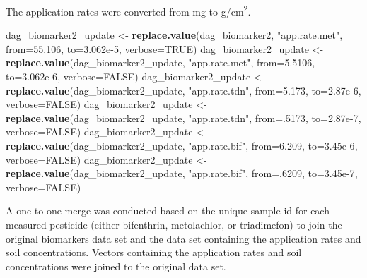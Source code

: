 \documentclass[
]{article}
\newenvironment{Shaded}{\begin{snugshade}}{\end{snugshade}}
\newcommand{\DataTypeTok}[1]{\textcolor[rgb]{0.13,0.29,0.53}{#1}}
\newcommand{\DecValTok}[1]{\textcolor[rgb]{0.00,0.00,0.81}{#1}}
\newcommand{\FloatTok}[1]{\textcolor[rgb]{0.00,0.00,0.81}{#1}}
\newcommand{\KeywordTok}[1]{\textcolor[rgb]{0.13,0.29,0.53}{\textbf{#1}}}
\newcommand{\NormalTok}[1]{#1}
\newcommand{\OtherTok}[1]{\textcolor[rgb]{0.56,0.35,0.01}{#1}}
\newcommand{\StringTok}[1]{\textcolor[rgb]{0.31,0.60,0.02}{#1}}
\begin{document}
The application rates were converted from mg to g/cm\textsuperscript{2}.

\begin{Shaded}
\begin{Highlighting}[]
\NormalTok{dag_biomarker2_update <-}\StringTok{ }\KeywordTok{replace.value}\NormalTok{(dag_biomarker2, }\StringTok{"app.rate.met"}\NormalTok{, }\DataTypeTok{from=}\FloatTok{55.106}\NormalTok{, }\DataTypeTok{to=}\FloatTok{3.062e-5}\NormalTok{, }\DataTypeTok{verbose=}\OtherTok{TRUE}\NormalTok{)}
\NormalTok{dag_biomarker2_update <-}\StringTok{ }\KeywordTok{replace.value}\NormalTok{(dag_biomarker2_update, }\StringTok{"app.rate.met"}\NormalTok{, }\DataTypeTok{from=}\FloatTok{5.5106}\NormalTok{, }\DataTypeTok{to=}\FloatTok{3.062e-6}\NormalTok{, }\DataTypeTok{verbose=}\OtherTok{FALSE}\NormalTok{)}
\NormalTok{dag_biomarker2_update <-}\StringTok{ }\KeywordTok{replace.value}\NormalTok{(dag_biomarker2_update, }\StringTok{"app.rate.tdn"}\NormalTok{, }\DataTypeTok{from=}\FloatTok{5.173}\NormalTok{, }\DataTypeTok{to=}\FloatTok{2.87e-6}\NormalTok{, }\DataTypeTok{verbose=}\OtherTok{FALSE}\NormalTok{)}
\NormalTok{dag_biomarker2_update <-}\StringTok{ }\KeywordTok{replace.value}\NormalTok{(dag_biomarker2_update, }\StringTok{"app.rate.tdn"}\NormalTok{, }\DataTypeTok{from=}\NormalTok{.}\DecValTok{5173}\NormalTok{, }\DataTypeTok{to=}\FloatTok{2.87e-7}\NormalTok{, }\DataTypeTok{verbose=}\OtherTok{FALSE}\NormalTok{)}
\NormalTok{dag_biomarker2_update <-}\StringTok{ }\KeywordTok{replace.value}\NormalTok{(dag_biomarker2_update, }\StringTok{"app.rate.bif"}\NormalTok{, }\DataTypeTok{from=}\FloatTok{6.209}\NormalTok{, }\DataTypeTok{to=}\FloatTok{3.45e-6}\NormalTok{, }\DataTypeTok{verbose=}\OtherTok{FALSE}\NormalTok{)}
\NormalTok{dag_biomarker2_update <-}\StringTok{ }\KeywordTok{replace.value}\NormalTok{(dag_biomarker2_update, }\StringTok{"app.rate.bif"}\NormalTok{, }\DataTypeTok{from=}\NormalTok{.}\DecValTok{6209}\NormalTok{, }\DataTypeTok{to=}\FloatTok{3.45e-7}\NormalTok{, }\DataTypeTok{verbose=}\OtherTok{FALSE}\NormalTok{)}
\end{Highlighting}
\end{Shaded}

A one-to-one merge was conducted based on the unique sample id for each
measured pesticide (either bifenthrin, metolachlor, or triadimefon) to
join the original biomarkers data set and the data set containing the
application rates and soil concentrations. Vectors containing the
application rates and soil concentrations were joined to the original
data set.
\end{document}
